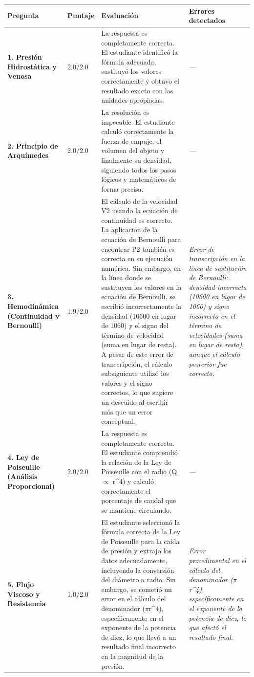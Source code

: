 \documentclass[11pt,a4paper]{article}
\begin{document}
\begin{longtable}{>{\bfseries}p{2.8cm} p{1.6cm} p{7.0cm} p{2.8cm}}
  \toprule
  \textbf{Pregunta} & \textbf{Puntaje} & \textbf{Evaluación} & \textbf{Errores detectados} \\
  \midrule
  \endhead
  \bottomrule
  \endfoot
    \textbf{1. Presión Hidrostática y Venosa} & 2.0/2.0 & La respuesta es completamente correcta. El estudiante identificó la fórmula adecuada, sustituyó los valores correctamente y obtuvo el resultado exacto con las unidades apropiadas. & \textit{---} \\
    \midrule
    \textbf{2. Principio de Arquímedes} & 2.0/2.0 & La resolución es impecable. El estudiante calculó correctamente la fuerza de empuje, el volumen del objeto y finalmente su densidad, siguiendo todos los pasos lógicos y matemáticos de forma precisa. & \textit{---} \\
    \midrule
    \textbf{3. Hemodinámica (Continuidad y Bernoulli)} & 1.9/2.0 & El cálculo de la velocidad V2 usando la ecuación de continuidad es correcto. La aplicación de la ecuación de Bernoulli para encontrar P2 también es correcta en su ejecución numérica. Sin embargo, en la línea donde se sustituyen los valores en la ecuación de Bernoulli, se escribió incorrectamente la densidad (10600 en lugar de 1060) y el signo del término de velocidad (suma en lugar de resta). A pesar de este error de transcripción, el cálculo subsiguiente utilizó los valores y el signo correctos, lo que sugiere un descuido al escribir más que un error conceptual. & \textit{Error de transcripción en la línea de sustitución de Bernoulli: densidad incorrecta (10600 en lugar de 1060) y signo incorrecto en el término de velocidades (suma en lugar de resta), aunque el cálculo posterior fue correcto.} \\
    \midrule
    \textbf{4. Ley de Poiseuille (Análisis Proporcional)} & 2.0/2.0 & La respuesta es completamente correcta. El estudiante comprendió la relación de la Ley de Poiseuille con el radio (Q $\propto$ r\textasciicircum{}4) y calculó correctamente el porcentaje de caudal que se mantiene circulando. & \textit{---} \\
    \midrule
    \textbf{5. Flujo Viscoso y Resistencia} & 1.0/2.0 & El estudiante seleccionó la fórmula correcta de la Ley de Poiseuille para la caída de presión y extrajo los datos adecuadamente, incluyendo la conversión del diámetro a radio. Sin embargo, se cometió un error en el cálculo del denominador ($\pi$r\textasciicircum{}4), específicamente en el exponente de la potencia de diez, lo que llevó a un resultado final incorrecto en la magnitud de la presión. & \textit{Error procedimental en el cálculo del denominador ($\pi$r\textasciicircum{}4), específicamente en el exponente de la potencia de diez, lo que afectó el resultado final.} \\
    \midrule
\end{longtable}
\end{document}
